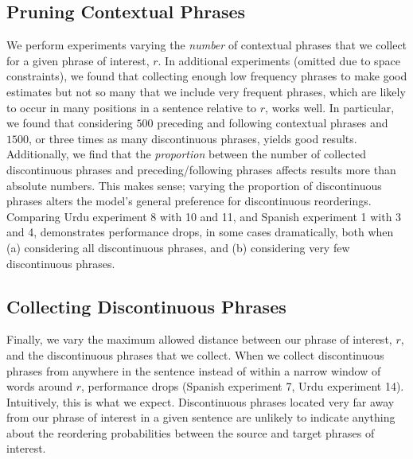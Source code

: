\documentclass[11pt,letterpaper]{article}
\begin{document}
\subsection{Pruning Contextual Phrases}
We perform experiments varying the {\it number} of contextual phrases that we collect for a given phrase of interest, $r$. In additional experiments (omitted due to space constraints), we found that collecting enough low frequency phrases to make good estimates but not so many that we include very frequent phrases, which are likely to occur in many positions in a sentence relative to $r$, works well. In particular, we found that considering $500$ preceding and following contextual phrases and $1500$, or three times as many discontinuous phrases, yields good results. Additionally, we find that the {\it proportion} between the number of collected discontinuous phrases and preceding/following phrases affects results more than absolute numbers. This makes sense; varying the proportion of discontinuous phrases alters the model's general preference for discontinuous reorderings. Comparing Urdu experiment 8 with 10 and 11, and Spanish experiment 1 with 3 and 4, demonstrates performance drops, in some cases dramatically, both when (a) considering all discontinuous phrases, and (b) considering very few discontinuous phrases. %

\subsection{Collecting Discontinuous Phrases}
Finally, we vary the maximum allowed distance between our phrase of interest, $r$, and the discontinuous phrases that we collect. 
When we collect discontinuous phrases from anywhere in the sentence instead of within a narrow window of words around $r$, performance drops (Spanish experiment 7, Urdu experiment 14).
Intuitively, this is what we expect. Discontinuous phrases located very far away from our phrase of interest in a given sentence are unlikely to indicate anything about the reordering probabilities between the source and target phrases of interest.
\end{document}
